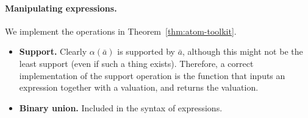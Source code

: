 \paragraph*{Manipulating expressions.} We implement the operations in Theorem~\ref{thm:atom-toolkit}.
\begin{itemize}
	\item {\bf Support.} Clearly $\alpha(\bar a)$ is supported by $\bar a$, although this might not be the least support (even if such a thing exists). Therefore, a correct implementation of the support operation is the function that inputs an expression together with a valuation, and returns the valuation.
	\item {\bf Binary union.} Included in the syntax of expressions.
	

\end{itemize}
